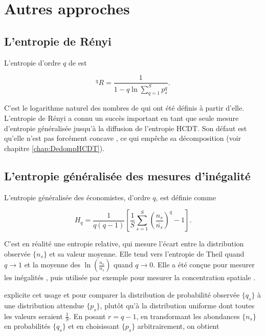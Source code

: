 \documentclass[
  11pt,
  french,
  a4paper,
  extrafontsizes,onecolumn,openright
  ]{memoir}
\begin{document}
\hypertarget{autres-approches}{%
\section{Autres approches}\label{autres-approches}}

\hypertarget{lentropie-de-ruxe9nyi}{%
\subsection{L'entropie de Rényi}\label{lentropie-de-ruxe9nyi}}

L'entropie d'ordre \(q\) de \textcite{Renyi1961} est

\begin{equation}
  \label{eq:Renyi}
  ^{q}\!R =\frac{1}{1-q\ln\sum^S_{q=1}{p^q_s}}.
\end{equation}

C'est le logarithme naturel des nombres de \textcite{Hill1973} qui ont été définis à partir d'elle.
L'entropie de Rényi a connu un succès important en tant que seule mesure d'entropie généralisée jusqu'à la diffusion de l'entropie HCDT.
Son défaut est qu'elle n'est pas forcément concave \autocite{Beck2009}, ce qui empêche sa décomposition (voir chapitre \ref{chap:DedompHCDT}).

\hypertarget{lentropie-guxe9nuxe9ralisuxe9e-des-mesures-dinuxe9galituxe9}{%
\subsection{L'entropie généralisée des mesures d'inégalité}\label{lentropie-guxe9nuxe9ralisuxe9e-des-mesures-dinuxe9galituxe9}}

L'entropie généralisée des économistes, d'ordre \(q\), est définie comme

\begin{equation}
  \label{eq:HqEco}
  H_q = \frac{1}{q\left(q-1\right)} \left[\frac{1}{S}\sum^S_{s=1}{\left(\frac{n_s}{\bar{n_s}}\right)^{q}}-1\right].
\end{equation}

C'est en réalité une entropie relative, qui mesure l'écart entre la distribution observée \(\{n_s\}\) et sa valeur moyenne. Elle tend vers l'entropie de Theil quand \(q \to 1\) et la moyenne des \(\ln(\frac{n_s}{\bar{n_s}})\) quand \(q \to 0\).
Elle a été conçue pour mesurer les inégalités \autocite{Cowell2000}, puis utilisée par exemple pour mesurer la concentration spatiale \autocite{Brulhart2005}.

\textcite{Maasoumi1993} explicite cet usage et pour comparer la distribution de probabilité observée \(\{q_s\}\) à une distribution attendue \(\{p_s\}\), plutôt qu'à la distribution uniforme dont toutes les valeurs seraient \(\frac{1}{S}\). En posant \(r=q-1\), en transformant les abondances \(\{n_s\}\) en probabilités \(\{q_s\}\) et en choisissant \(\{p_s\}\) arbitrairement, on obtient
\end{document}
